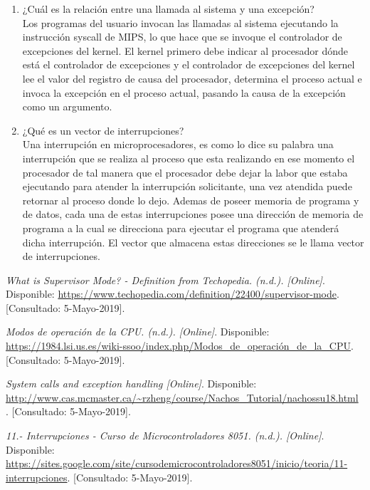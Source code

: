\documentclass{article}
\begin{document}
\begin{enumerate}
	\item {
	¿Cuál es la relación entre una llamada al sistema y una excepción? \\
	
	Los programas del usuario invocan las llamadas al sistema ejecutando la instrucción syscall de MIPS, lo que hace que se invoque el controlador de excepciones del kernel. El kernel primero debe indicar al procesador dónde está el controlador de excepciones y el controlador de excepciones del kernel lee el valor del registro de causa del procesador, determina el proceso actual e invoca la excepción en el proceso actual, pasando la causa de la excepción como un argumento.\cite{syscall} \\
	
	}
	\item {
	¿Qué es un vector de interrupciones?\\
	
	Una interrupción en microprocesadores, es como lo dice su palabra una interrupción que se realiza al proceso que esta realizando en ese momento el procesador de tal manera que el procesador debe dejar la labor que estaba ejecutando para atender la interrupción solicitante, una vez atendida puede retornar al proceso donde lo dejo.	Ademas de poseer memoria de programa y de datos, cada una de estas interrupciones posee una dirección de memoria de programa a la cual se direcciona para ejecutar el programa que atenderá dicha interrupción. El  vector que almacena estas direcciones se le llama vector de interrupciones.\cite{vector}\\
	
	}
    \end{enumerate}

 \begin{thebibliography}{1}
	\textit{What is Supervisor Mode? - Definition from Techopedia. (n.d.). [Online]}. Disponible: 
	\url{https://www.techopedia.com/definition/22400/supervisor-mode}.
	[Consultado: 5-Mayo-2019].
	
	\textit{Modos de operación de la CPU. (n.d.). [Online]}. Disponible: 
	\url{https://1984.lsi.us.es/wiki-ssoo/index.php/Modos_de_operación_de_la_CPU}.
	[Consultado: 5-Mayo-2019].
	
	
	\textit{ System calls and exception handling [Online]}. Disponible: 
	\url{http://www.cas.mcmaster.ca/~rzheng/course/Nachos_Tutorial/nachossu18.html }.
	[Consultado: 5-Mayo-2019].
	
	\textit{11.- Interrupciones - Curso de Microcontroladores 8051. (n.d.). [Online]}. Disponible: 
	\url{ https://sites.google.com/site/cursodemicrocontroladores8051/inicio/teoria/11-interrupciones}.
	[Consultado: 5-Mayo-2019].
	
	
\end{thebibliography}
\end{document}
